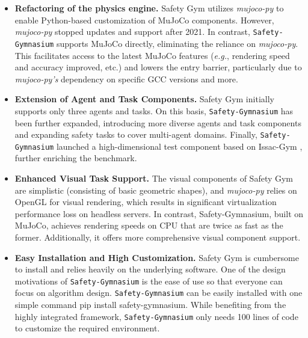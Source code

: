 \documentclass{article}
\begin{document}
\begin{itemize}[left=0.3cm]
    \item \textbf{Refactoring of the physics engine.} Safety Gym utilizes \textit{mujoco-py} to enable Python-based customization of MuJoCo components. However, \textit{mujoco-py} stopped updates and support after 2021. In contrast, \texttt{Safety-Gymnasium} supports MuJoCo directly, eliminating the reliance on \textit{mujoco-py}. This facilitates access to the latest MuJoCo features (\textit{e.g.}, rendering speed and accuracy improved, etc.) and lowers the entry barrier, particularly due to \textit{mujoco-py's} dependency on specific GCC versions and more.
    \item \textbf{Extension of Agent and Task Components.} Safety Gym initially supports only three agents and tasks. On this basis, \texttt{Safety-Gymnasium} has been further expanded, introducing more diverse agents and task components and expanding safety tasks to cover multi-agent domains. Finally, \texttt{Safety-Gymnasium} launched a high-dimensional test component based on Issac-Gym \cite{makoviychuk2021isaac}, further enriching the benchmark.
    \item \textbf{Enhanced Visual Task Support.} The visual components of Safety Gym are simplistic (consisting of basic geometric shapes), and \textit{mujoco-py} relies on OpenGL for visual rendering, which results in significant virtualization performance loss on headless servers. In contrast, Safety-Gymnasium, built on MuJoCo, achieves rendering speeds on CPU that are twice as fast as the former. Additionally, it offers more comprehensive visual component support.
    \item \textbf{Easy Installation and High Customization.} Safety Gym is cumbersome to install and relies heavily on the underlying software. One of the design motivations of \texttt{Safety-Gymnasium} is the ease of use so that everyone can focus on algorithm design. \texttt{Safety-Gymnasium} can be easily installed with one simple command pip install safety-gymnasium. While benefiting from the highly integrated framework, \texttt{Safety-Gymnasium} only needs 100 lines of code to customize the required environment.
\end{itemize}
\end{document}
